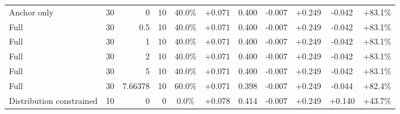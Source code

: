 \begin{table}[htbp]
\begin{tabular}{lrrrccccccc}
Anchor only & 30 & 0 & 10 & 40.0\% & +0.071 & 0.400 & -0.007 & +0.249 & -0.042 & +83.1\% \\
Full & 30 & 0.5 & 10 & 40.0\% & +0.071 & 0.400 & -0.007 & +0.249 & -0.042 & +83.1\% \\
Full & 30 & 1 & 10 & 40.0\% & +0.071 & 0.400 & -0.007 & +0.249 & -0.042 & +83.1\% \\
Full & 30 & 2 & 10 & 40.0\% & +0.071 & 0.400 & -0.007 & +0.249 & -0.042 & +83.1\% \\
Full & 30 & 5 & 10 & 40.0\% & +0.071 & 0.400 & -0.007 & +0.249 & -0.042 & +83.1\% \\
Full & 30 & 7.66378 & 10 & 60.0\% & +0.071 & 0.398 & -0.007 & +0.249 & -0.044 & +82.4\% \\
Distribution constrained & 10 & 0 & 0 & 0.0\% & +0.078 & 0.414 & -0.007 & +0.249 & +0.140 & +43.7\% \\
\bottomrule
\end{tabular}
\end{table}